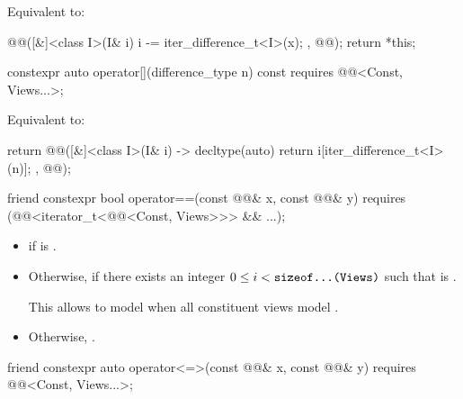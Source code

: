\begin{itemdescr}
\pnum
\effects
Equivalent to:
\begin{codeblock}
@@([&]<class I>(I& i) { i -= iter_difference_t<I>(x); }, @@);
return *this;
\end{codeblock}
\end{itemdescr}

\begin{itemdecl}
constexpr auto operator[](difference_type n) const
  requires @@<Const, Views...>;
\end{itemdecl}

\begin{itemdescr}
\pnum
\effects
Equivalent to:
\begin{codeblock}
return @@([&]<class I>(I& i) -> decltype(auto) {
  return i[iter_difference_t<I>(n)];
}, @@);
\end{codeblock}
\end{itemdescr}

\begin{itemdecl}
friend constexpr bool operator==(const @@& x, const @@& y)
  requires (@@<iterator_t<@@<Const, Views>>> && ...);
\end{itemdecl}

\begin{itemdescr}
\pnum
\returns
\begin{itemize}
\item
{}
if  is .
\item
Otherwise, 
if there exists an integer $0 \leq i < \texttt{\protect sizeof...(Views)}$
such that  is .
\begin{note}
This allows  to model 
when all constituent views model .
\end{note}
\item
Otherwise, .
\end{itemize}
\end{itemdescr}

\begin{itemdecl}
friend constexpr auto operator<=>(const @@& x, const @@& y)
  requires @@<Const, Views...>;
\end{itemdecl}

